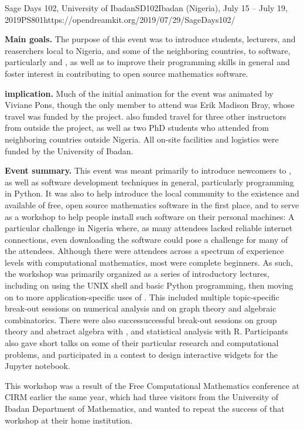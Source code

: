 \begin{event}{Sage Days 102, University of Ibadan}{SD102}{Ibadan (Nigeria), July 15 -- July 19, 2019}{PS}{80}{1}{https://opendreamkit.org/2019/07/29/SageDays102/}

\textbf{Main goals.} The purpose of this event was to introduce students,
lecturers, and reaserchers local to Nigeria, and some of the
neighboring countries, to \ODK software, particularly \Sage and \GAP,
as well as to improve their programming skills in general and foster
interest in contributing to open source mathematics software.

\textbf{\ODK implication.} Much of the initial animation for the event was
animated by Viviane Pons, though the only \ODK member to attend was
Erik Madison Bray, whose travel was funded by the project.  \ODK also
funded travel for three other instructors from outside the project, as
well as two PhD students who attended from neighboring countries
outside Nigeria.  All on-site facilities and logistics were funded by the
University of Ibadan.

\textbf{Event summary.} This event was meant primarily to introduce newcomers
to \Sage, as well as software development techniques in general,
particularly programming in Python.  It was also to help introduce the
local community to the existence and available of free, open source
mathematics software in the first place, and to serve as a workshop to
help people install such software on their personal machines: A
particular challenge in Nigeria where, as many attendees lacked
reliable internet connections, even downloading the software could pose
a challenge for many of the attendees.  Although there were attendees
across a spectrum of experience levels with computational mathematics,
most were complete beginners.  As such, the workshop was primarily
organized as a series of introductory lectures, including on using the
UNIX shell and basic Python programming, then moving on to more
application-specific uses of \Sage.  This included multiple
topic-specific break-out sessions on numerical analysis and on graph
theory and algebraic combinatorics.  There were also successuccessful
break-out sessions on group theory and abstract algebra with \GAP, and
statistical analysis with R. Participants also gave short talks on some
of their particular research and computational problems, and participated
in a contest to design interactive widgets for the Jupyter notebook.

This workshop was a result of the Free Computational Mathematics conference at
CIRM earlier the same year, which had three visitors from the University
of Ibadan Department of Mathematics, and wanted to repeat the success of
that workshop at their home institution.



\end{event}
